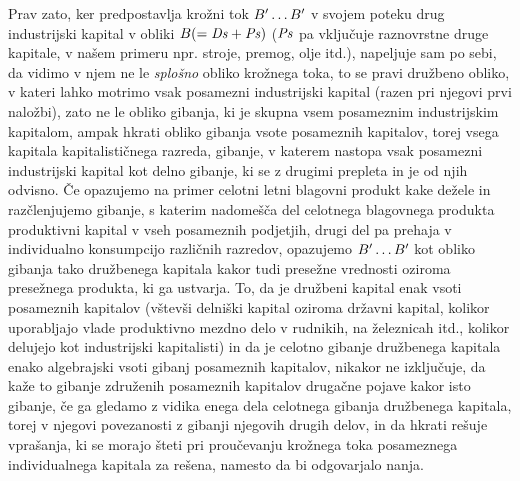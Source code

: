 \documentclass[kapital_02.tex]{subfiles}
\begin{document}
Prav zato, ker predpostavlja krožni tok \( B' \dots B' \) v svojem poteku drug industrijski kapital v obliki \( B ( = \mathit{Ds} + \mathit{Ps} ) \) (\( \mathit{Ps} \) pa vključuje raznovrstne druge kapitale, v našem primeru npr. stroje, premog, olje itd.), napeljuje sam po sebi, da vidimo v njem ne le \emph{splošno} obliko krožnega toka, to se pravi družbeno obliko, v kateri lahko motrimo vsak posamezni industrijski kapital (razen pri njegovi prvi naložbi), zato ne le obliko gibanja, ki je skupna vsem posameznim industrijskim \KPEstran kapitalom, ampak hkrati obliko gibanja vsote posameznih kapitalov, torej vsega kapitala kapitalističnega razreda, gibanje, v katerem nastopa vsak posamezni industrijski kapital kot delno gibanje, ki se z drugimi prepleta in je od njih odvisno. Če opazujemo na primer celotni letni blagovni produkt kake dežele in razčlenjujemo gibanje, s katerim nadomešča del celotnega blagovnega produkta produktivni kapital v vseh posameznih podjetjih, drugi del pa prehaja v individualno konsumpcijo različnih razredov, opazujemo \( B' \dots B' \) kot obliko gibanja tako družbenega kapitala kakor tudi presežne vrednosti oziroma presežnega produkta, ki ga ustvarja. To, da je družbeni kapital enak vsoti posameznih kapitalov (vštevši delniški kapital oziroma državni kapital, kolikor uporabljajo vlade produktivno mezdno delo v rudnikih, na železnicah itd., kolikor delujejo kot industrijski kapitalisti) in da je celotno gibanje družbenega kapitala enako algebrajski vsoti gibanj posameznih kapitalov, nikakor ne izključuje, da kaže to gibanje združenih posameznih kapitalov drugačne pojave kakor isto gibanje, če ga gledamo z vidika enega dela celotnega gibanja družbenega kapitala, torej v njegovi povezanosti z gibanji njegovih drugih delov, in da hkrati rešuje vprašanja, ki se morajo šteti pri proučevanju krožnega toka posameznega individualnega kapitala za rešena, namesto da bi odgovarjalo nanja.
\end{document}
